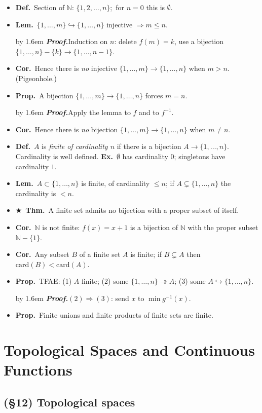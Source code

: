 \documentclass[12pt,a4paper]{article}
\newcommand{\Dfn}{\textbf{Def.}~}
\newcommand{\Thm}{\textbf{Thm.}~}
\newcommand{\Lem}{\textbf{Lem.}~}
\newcommand{\Prp}{\textbf{Prop.}~}
\newcommand{\Cor}{\textbf{Cor.}~}
\newcommand{\Exa}{\textbf{Ex.}~}
\newcommand{\Key}{$\bigstar$~}                  %
\newcommand{\Pf}[1]{%
  \par\addvspace{7pt}\nopagebreak
  \begingroup
    \advance\leftskip by 1.6em
    \parindent=0pt \small\color{prf}%
    \textbf{\textit{Proof.}}\enspace #1\par
  \endgroup
  \addvspace{9pt}}
\newenvironment{BL}%
  {\begin{itemize}[leftmargin=1.4em,labelsep=0.55em,itemsep=11pt,topsep=11pt,parsep=0pt]}%
  {\end{itemize}}
\newcommand{\NN}{\mathbb{N}}
\newcommand{\imp}{\Rightarrow}
\begin{document}
\begin{BL}
\item \Dfn Section of $\NN$: $\{1,2,\dots,n\}$;\ for $n=0$ this is $\emptyset$.
\item \Lem $\{1,\dots,m\}\hookrightarrow\{1,\dots,n\}$ injective $\imp m\le n$.
\Pf{Induction on $n$: delete $f(m)=k$, use a bijection $\{1,\dots,n\}-\{k\}\to\{1,\dots,n-1\}$.}
\item \Cor Hence there is \emph{no} injective $\{1,\dots,m\}\to\{1,\dots,n\}$ when $m>n$.
      (Pigeonhole.)
\item \Prp A bijection $\{1,\dots,m\}\to\{1,\dots,n\}$ forces $m=n$.
      \Pf{Apply the lemma to $f$ and to $f^{-1}$.}
\item \Cor Hence there is \emph{no} bijection $\{1,\dots,m\}\to\{1,\dots,n\}$ when $m\neq n$.
\item \Dfn $A$ is \emph{finite of cardinality $n$} if there is a bijection $A\to\{1,\dots,n\}$.
      Cardinality is well defined.
      \Exa $\emptyset$ has cardinality $0$; singletons have cardinality $1$.
\item \Lem $A\subset\{1,\dots,n\}$ is finite, of cardinality $\le n$;
      if $A\subsetneq\{1,\dots,n\}$ the cardinality is $<n$.
\item \Key\Thm A finite set admits no bijection with a proper subset of itself.
\item \Cor $\NN$ is not finite: $f(x)=x+1$ is a bijection of $\NN$ with the proper subset
      $\NN-\{1\}$.
\item \Cor Any subset $B$ of a finite set $A$ is finite; if $B\subsetneq A$ then
      $\mathrm{card}(B)<\mathrm{card}(A)$.
\item \Prp TFAE: (1) $A$ finite; (2) some $\{1,\dots,n\}\twoheadrightarrow A$;
      (3) some $A\hookrightarrow\{1,\dots,n\}$.
\Pf{$(2)\imp(3)$: send $x$ to $\min g^{-1}(x)$.}
\item \Prp Finite unions and finite products of finite sets are finite.
\end{BL}

\section{Topological Spaces and Continuous Functions}

\subsection{(\S12) Topological spaces}
\end{document}
